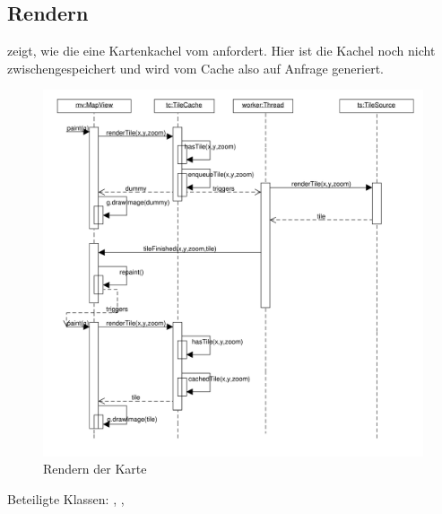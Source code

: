 \documentclass[a4paper, 11pt]{article}
\begin{document}
\subsection{Rendern}
 zeigt, wie die  eine Kartenkachel vom  anfordert.
Hier ist die Kachel noch nicht zwischengespeichert und wird vom Cache also auf Anfrage generiert.
\begin{figure}[H]
\centering
\includegraphics[width=\textwidth]{RenderSequenz}
\caption{Rendern der Karte}
\label{fig:sequenz_rendern}
\end{figure}
Beteiligte Klassen: , , 
\end{document}
